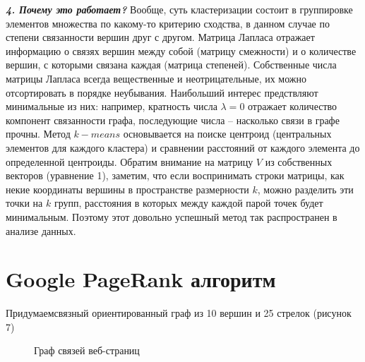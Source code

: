\documentclass[a5paper, 10pt]{article}
\theoremstyle{definition}
\theoremstyle{plain}
\theoremstyle{remark}
\begin{document}
\textbf{\textit{4. Почему это работает?}} Вообще, суть кластеризации состоит в группировке элементов множества по какому-то критерию сходства, в данном случае по степени связанности вершин друг с другом. Матрица Лапласа отражает информацию о связях вершин между собой (матрицу смежности) и о количестве вершин, с которыми связана каждая (матрица степеней). Собственные числа матрицы Лапласа всегда вещественные и неотрицательные, их можно отсортировать в порядке неубывания. Наибольший интерес предствляют минимальные из них: например, кратность числа $\lambda = 0$ отражает количество компонент связанности графа, последующие числа -- насколько связи в графе прочны. Метод $k-means$ основывается на поиске центроид (центральных элементов для каждого кластера) и сравнении расстояний от каждого элемента до определенной центроиды. Обратим внимание на матрицу $V$ из собственных векторов (уравнение 1), заметим, что если воспринимать строки матрицы, как некие координаты вершины в пространстве размерности $k$, можно разделить эти точки на $k$ групп, расстояния в которых между каждой парой точек будет минимальным. Поэтому этот довольно успешный метод так распространен в анализе данных.

\newpage
\section{Google PageRank алгоритм}
Придумаемсвязный ориентированный граф из 10 вершин и 25 стрелок (рисунок 7)
\begin{figure}[h!]
\caption{Граф связей веб-страниц}
\end{figure}
\end{document}
